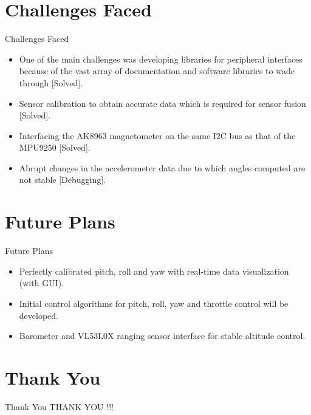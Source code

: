 \documentclass[10pt, a4paper]{beamer}
\begin{document}
\section{Challenges Faced}
\begin{frame}{Challenges Faced}
\begin{itemize}
\item One of the main challenges was developing libraries for peripheral interfaces because of the vast array of documentation and software libraries to wade through [Solved].\\
\item Sensor calibration to obtain accurate data which is required for sensor fusion [Solved].\\
\item Interfacing the AK8963 magnetometer on the same I2C bus as that of the MPU9250 [Solved].\\
\item Abrupt changes in the accelerometer data due to which angles computed are not stable [Debugging].
\end{itemize}
\end{frame}

\section{Future Plans}
\begin{frame}{Future Plans}
\begin{itemize}
\item Perfectly calibrated pitch, roll and yaw with real-time data visualization (with GUI).\\
\item Initial control algorithms for pitch, roll, yaw and throttle control will be developed.\\
\item Barometer and VL53L0X ranging sensor interface for stable altitude control.
\end{itemize}
\end{frame}


\section{Thank You}
\begin{frame}{Thank You}
	\centering THANK YOU !!!
\end{frame}
\end{document}
